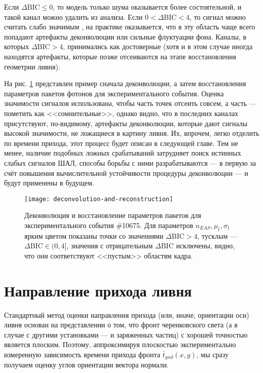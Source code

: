 Если $\Delta \mathrm{BIC} \leq 0$, то модель только шума оказывается более состоятельной, и такой канал можно удалить из анализа. Если $0 < \Delta \mathrm{BIC} < 4$, то сигнал можно считать слабо значимым \cite{Kass1995}, на практике оказывается, что в эту область чаще всего попадают артефакты деконволюции или сильные флуктуации фона. Каналы, в которых $\Delta \mathrm{BIC} > 4$, принимались как достоверные (хотя и в этом случае иногда находятся артефакты, которые позже отсеиваются на этапе восстановления геометрии ливня).

На рис. \ref{pic:deconvolution-and-reconstruction} представлен пример сначала деконволюции, а затем восстановления параметров пакетов фотонов для экспериментального события. Оценка значимости сигналов использована, чтобы часть точек отсеить совсем, а часть --- пометить как <<сомнительные>>, однако видно, что в последних каналах присутствуют, по-видимому, артефакты деконволюции, которые дают сигналы высокой значимости, не ложащиеся в картину ливня. Их, впрочем, легко отделить по времени прихода, этот процесс будет описан в следующей главе. Тем не менее, наличие подобных ложных срабатываний затрудняет поиск истинных слабых сигналов ШАЛ, способы борьбы с ними разрабатываются --- в первую за счёт повышения вычислительной устойчивости процедуры деконволюции --- и будут применены в будущем.

\begin{figure}
	\centering
	\texttt{[image: deconvolution-and-reconstruction]}
	\caption{Деконволюция и восстановление параметров пакетов для экспериментального события \#10675. Для параметров $n_{EAS}, \mu_t, \sigma_t$ ярким цветом показаны точки со значениями $\Delta \mathrm{BIC} > 4$, тусклым --- $\Delta \mathrm{BIC} \in (0, 4]$, значения с отрицательным $\Delta \mathrm{BIC}$ исключены, видно, что они соответствуют <<пустым>> областям кадра.}
	\label{pic:deconvolution-and-reconstruction}
\end{figure}


\section{Направление прихода ливня}

Стандартный метод оценки направления прихода (или, иначе, ориентации оси) ливня основан на представлении о том, что фронт черенковского света (а в случае с другими установками --- и заряженных частиц) с хорошей точностью является плоским. Поэтому, аппроксимируя плоскостью экспериментально измеренную зависимость времени прихода фронта $\bar{t}_{gnd}(x, y)$, мы сразу получаем оценку углов ориентации вектора нормали.

